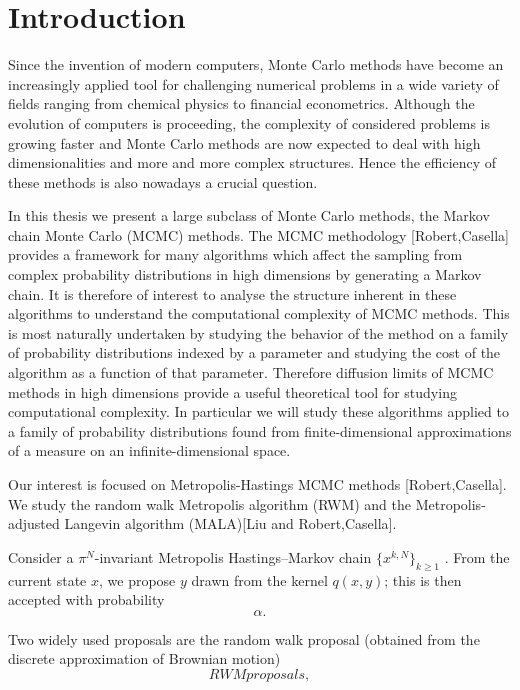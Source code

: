 \chapter{Introduction}
\label{sec:introduction}



Since the invention of modern computers, Monte Carlo methods have become an increasingly applied tool for challenging numerical problems in a wide variety of fields ranging from chemical physics to financial econometrics. Although the evolution of computers is proceeding, the complexity of considered problems is growing faster and Monte Carlo methods are now expected to deal with high dimensionalities and more and more complex structures. Hence the efficiency of these methods is also nowadays a crucial question.

In this thesis we present a large subclass of Monte Carlo methods, the Markov chain Monte Carlo (MCMC) methods. The MCMC methodology [Robert,Casella] provides a framework for many algorithms which affect the sampling from complex probability distributions in high dimensions by generating a Markov chain. It is therefore of interest to analyse the structure inherent in these algorithms to understand the computational complexity of MCMC methods. This is most naturally undertaken by studying the behavior of the method on a family of probability distributions indexed by a parameter and studying the cost of the algorithm as a function of that parameter. Therefore diffusion limits of MCMC methods in high dimensions provide
a useful theoretical tool for studying computational complexity. In particular we will study these algorithms applied to a family of probability distributions found from finite-dimensional approximations of a measure on an infinite-dimensional space.


Our interest is focused on Metropolis-Hastings MCMC methods [Robert,Casella]. We study the random walk Metropolis algorithm (RWM) and the Metropolis-adjusted Langevin algorithm (MALA)[Liu and Robert,Casella]. 

Consider a $ \pi^{N} $-invariant Metropolis Hastings–Markov chain $ \{ x^{k,N} \}_{k \geq 1} $ . From the current state $ x $, we propose $ y $ drawn from the kernel $ q(x, y) $; this is then accepted with probability
\begin{equation}
 \alpha .
\end{equation}

Two widely used proposals are the random walk proposal (obtained from
the discrete approximation of Brownian motion)
\begin{equation}
\label{RWM-proposals-simple}
 RWM proposals,
\end{equation}

